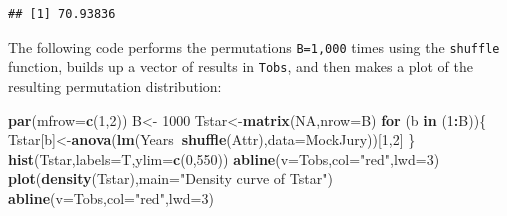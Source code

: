 \documentclass[]{book}
\newenvironment{Shaded}{\begin{snugshade}}{\end{snugshade}}
\newcommand{\KeywordTok}[1]{\textcolor[rgb]{0.13,0.29,0.53}{\textbf{#1}}}
\newcommand{\DataTypeTok}[1]{\textcolor[rgb]{0.13,0.29,0.53}{#1}}
\newcommand{\DecValTok}[1]{\textcolor[rgb]{0.00,0.00,0.81}{#1}}
\newcommand{\StringTok}[1]{\textcolor[rgb]{0.31,0.60,0.02}{#1}}
\newcommand{\OtherTok}[1]{\textcolor[rgb]{0.56,0.35,0.01}{#1}}
\newcommand{\ControlFlowTok}[1]{\textcolor[rgb]{0.13,0.29,0.53}{\textbf{#1}}}
\newcommand{\OperatorTok}[1]{\textcolor[rgb]{0.81,0.36,0.00}{\textbf{#1}}}
\newcommand{\NormalTok}[1]{#1}
\begin{document}
\begin{verbatim}
## [1] 70.93836
\end{verbatim}

The following code performs the permutations \texttt{B=1,000} times
using the \texttt{shuffle} function, builds up a vector of results in
\texttt{Tobs}, and then makes a plot of the resulting permutation
distribution:







\begin{Shaded}
\begin{Highlighting}[]
\KeywordTok{par}\NormalTok{(}\DataTypeTok{mfrow=}\KeywordTok{c}\NormalTok{(}\DecValTok{1}\NormalTok{,}\DecValTok{2}\NormalTok{))}
\NormalTok{B<-}\StringTok{ }\DecValTok{1000}
\NormalTok{Tstar<-}\KeywordTok{matrix}\NormalTok{(}\OtherTok{NA}\NormalTok{,}\DataTypeTok{nrow=}\NormalTok{B)}
\ControlFlowTok{for}\NormalTok{ (b }\ControlFlowTok{in}\NormalTok{ (}\DecValTok{1}\OperatorTok{:}\NormalTok{B))\{}
\NormalTok{  Tstar[b]<-}\KeywordTok{anova}\NormalTok{(}\KeywordTok{lm}\NormalTok{(Years}\OperatorTok{~}\KeywordTok{shuffle}\NormalTok{(Attr),}\DataTypeTok{data=}\NormalTok{MockJury))[}\DecValTok{1}\NormalTok{,}\DecValTok{2}\NormalTok{]}
\NormalTok{  \}}
\KeywordTok{hist}\NormalTok{(Tstar,}\DataTypeTok{labels=}\NormalTok{T,}\DataTypeTok{ylim=}\KeywordTok{c}\NormalTok{(}\DecValTok{0}\NormalTok{,}\DecValTok{550}\NormalTok{))}
\KeywordTok{abline}\NormalTok{(}\DataTypeTok{v=}\NormalTok{Tobs,}\DataTypeTok{col=}\StringTok{"red"}\NormalTok{,}\DataTypeTok{lwd=}\DecValTok{3}\NormalTok{)}
\KeywordTok{plot}\NormalTok{(}\KeywordTok{density}\NormalTok{(Tstar),}\DataTypeTok{main=}\StringTok{"Density curve of Tstar"}\NormalTok{)}
\KeywordTok{abline}\NormalTok{(}\DataTypeTok{v=}\NormalTok{Tobs,}\DataTypeTok{col=}\StringTok{"red"}\NormalTok{,}\DataTypeTok{lwd=}\DecValTok{3}\NormalTok{)}
\end{Highlighting}
\end{Shaded}
\end{document}
